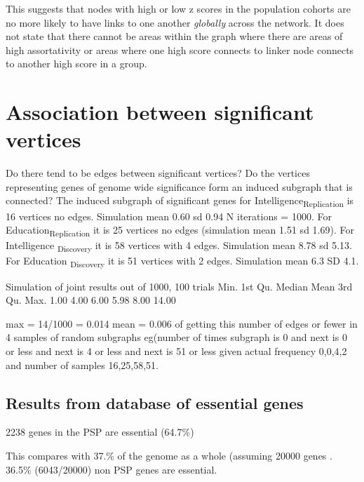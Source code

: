 This suggests that nodes with high or low z scores in the population cohorts are no more likely to have links to one another \textit{globally} across the network. It does not state that there cannot be areas within the graph where there are areas of high assortativity or areas where one high score connects to linker node connects to another high score in a group.

\section{Association between significant vertices}
Do there tend to be edges between significant vertices? Do the vertices representing genes of genome wide significance form an induced subgraph that is connected?
The induced subgraph  of significant genes for Intelligence\textsubscript{Replication} is 16 vertices no edges. Simulation mean 0.60 sd 0.94 N iterations = 1000. For Education\textsubscript{Replication} it is 25 vertices no edges (simulation mean 1.51 sd 1.69). For Intelligence \textsubscript{Discovery} it is 58 vertices with 4 edges. Simulation mean 8.78 sd 5.13. For Education \textsubscript{Discovery} it is 51 vertices with 2 edges. Simulation mean 6.3 SD 4.1.

Simulation of joint results out of 1000, 100 trials
Min. 1st Qu.  Median    Mean 3rd Qu.    Max. 
   1.00    4.00    6.00    5.98    8.00   14.00 
   
   max = 14/1000 = 0.014
   mean = 0.006 of getting this number of edges or fewer in 4 samples of random subgraphs eg(number of times subgraph is 0 and next is 0 or less and next is 4 or less and next is 51 or less given actual frequency 0,0,4,2 and number of samples 16,25,58,51.
   
 


 
 
 \subsection{Results from database of essential genes}

2238 genes in the PSP are essential (64.7\%)

This compares with 37.\% of the genome as a whole (assuming 20000 genes . 36.5\% (6043/20000) non PSP genes are essential. 


